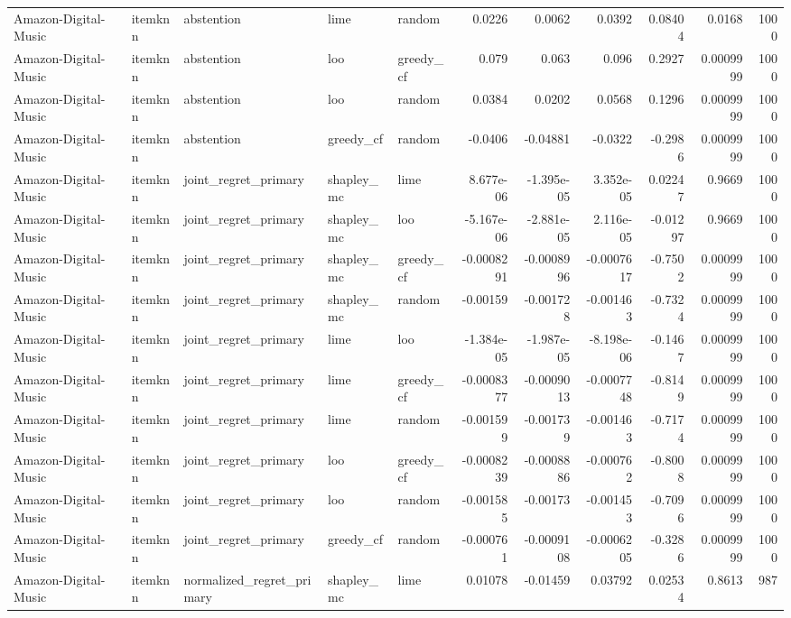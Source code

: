 \begin{table}[t]
\begin{tabular}{lllllrrrrrr}
Amazon-Digital-Music & itemknn & abstention & lime & random & 0.0226 & 0.0062 & 0.0392 & 0.08404 & 0.0168 & 1000 \\
Amazon-Digital-Music & itemknn & abstention & loo & greedy\_cf & 0.079 & 0.063 & 0.096 & 0.2927 & 0.0009999 & 1000 \\
Amazon-Digital-Music & itemknn & abstention & loo & random & 0.0384 & 0.0202 & 0.0568 & 0.1296 & 0.0009999 & 1000 \\
Amazon-Digital-Music & itemknn & abstention & greedy\_cf & random & -0.0406 & -0.04881 & -0.0322 & -0.2986 & 0.0009999 & 1000 \\
Amazon-Digital-Music & itemknn & joint\_regret\_primary & shapley\_mc & lime & 8.677e-06 & -1.395e-05 & 3.352e-05 & 0.02247 & 0.9669 & 1000 \\
Amazon-Digital-Music & itemknn & joint\_regret\_primary & shapley\_mc & loo & -5.167e-06 & -2.881e-05 & 2.116e-05 & -0.01297 & 0.9669 & 1000 \\
Amazon-Digital-Music & itemknn & joint\_regret\_primary & shapley\_mc & greedy\_cf & -0.0008291 & -0.0008996 & -0.0007617 & -0.7502 & 0.0009999 & 1000 \\
Amazon-Digital-Music & itemknn & joint\_regret\_primary & shapley\_mc & random & -0.00159 & -0.001728 & -0.001463 & -0.7324 & 0.0009999 & 1000 \\
Amazon-Digital-Music & itemknn & joint\_regret\_primary & lime & loo & -1.384e-05 & -1.987e-05 & -8.198e-06 & -0.1467 & 0.0009999 & 1000 \\
Amazon-Digital-Music & itemknn & joint\_regret\_primary & lime & greedy\_cf & -0.0008377 & -0.0009013 & -0.0007748 & -0.8149 & 0.0009999 & 1000 \\
Amazon-Digital-Music & itemknn & joint\_regret\_primary & lime & random & -0.001599 & -0.001739 & -0.001463 & -0.7174 & 0.0009999 & 1000 \\
Amazon-Digital-Music & itemknn & joint\_regret\_primary & loo & greedy\_cf & -0.0008239 & -0.0008886 & -0.000762 & -0.8008 & 0.0009999 & 1000 \\
Amazon-Digital-Music & itemknn & joint\_regret\_primary & loo & random & -0.001585 & -0.00173 & -0.001453 & -0.7096 & 0.0009999 & 1000 \\
Amazon-Digital-Music & itemknn & joint\_regret\_primary & greedy\_cf & random & -0.000761 & -0.0009108 & -0.0006205 & -0.3286 & 0.0009999 & 1000 \\
Amazon-Digital-Music & itemknn & normalized\_regret\_primary & shapley\_mc & lime & 0.01078 & -0.01459 & 0.03792 & 0.02534 & 0.8613 & 987 \\

\end{tabular}
\end{table}
